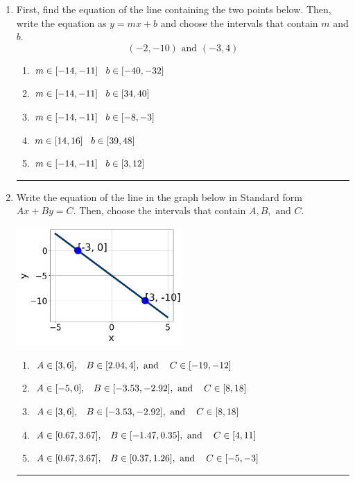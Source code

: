 \documentclass[14pt]{extbook}
\newcommand{\litem}[1]{\item#1\hspace*{-1cm}\rule{\textwidth}{0.4pt}}
\begin{document}
\begin{enumerate}
{\begin{enumerate}[label=\Alph*.]
\end{enumerate} }
\litem{
First, find the equation of the line containing the two points below. Then, write the equation as $ y=mx+b $ and choose the intervals that contain $m$ and $b$.\[ (-2, -10) \text{ and } (-3, 4) \]\begin{enumerate}[label=\Alph*.]
\item \( m \in [-14, -11] \hspace*{3mm} b \in [-40, -32] \)
\item \( m \in [-14, -11] \hspace*{3mm} b \in [34, 40] \)
\item \( m \in [-14, -11] \hspace*{3mm} b \in [-8, -3] \)
\item \( m \in [14, 16] \hspace*{3mm} b \in [39, 48] \)
\item \( m \in [-14, -11] \hspace*{3mm} b \in [3, 12] \)

\end{enumerate} }
\litem{
Write the equation of the line in the graph below in Standard form $Ax+By=C$. Then, choose the intervals that contain $A, B, \text{ and } C$.
\begin{center}
    \includegraphics[width=0.5\textwidth]{../Figures/linearGraphToStandardCopyA.png}
\end{center}
\begin{enumerate}[label=\Alph*.]
\item \( A \in [3, 6], \hspace{3mm} B \in [2.04, 4], \text{ and } \hspace{3mm} C \in [-19, -12] \)
\item \( A \in [-5, 0], \hspace{3mm} B \in [-3.53, -2.92], \text{ and } \hspace{3mm} C \in [8, 18] \)
\item \( A \in [3, 6], \hspace{3mm} B \in [-3.53, -2.92], \text{ and } \hspace{3mm} C \in [8, 18] \)
\item \( A \in [0.67, 3.67], \hspace{3mm} B \in [-1.47, 0.35], \text{ and } \hspace{3mm} C \in [4, 11] \)
\item \( A \in [0.67, 3.67], \hspace{3mm} B \in [0.37, 1.26], \text{ and } \hspace{3mm} C \in [-5, -3] \)


\end{enumerate}}
\end{enumerate}
\end{document}
